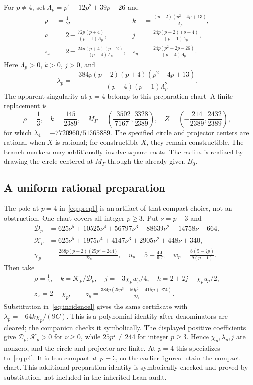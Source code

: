 \documentclass[11pt,a4paper]{article}
\theoremstyle{remark}\newtheorem{remark}[theorem]{Remark}
\begin{document}
For $p\ne4$, set $\Lambda_p=p^3+12p^2+39p-26$ and
\begin{align}
 \rho&=\tfrac12,& k&=\frac{(p-2)(p^2-4p+13)}{\Lambda_p},\label{eq:prep1}\\
 h&=2-\frac{72p(p+4)}{(p-1)\Lambda_p},&j&=\frac{24p(p-2)(p+4)}{(p-1)\Lambda_p},\nonumber\\
 z_x&=2-\frac{24p(p+4)(p-2)}{(p-4)\Lambda_p},&z_y&=\frac{24p(p^2+2p-26)}{(p-4)\Lambda_p}.\nonumber
\end{align}
Here $\Lambda_p>0$, $k>0$, $j>0$, and
\[
 \lambda_p=-\frac{384p(p-2)(p+4)(p^2-4p+13)}{(p-4)(p-1)\Lambda_p^2}.
\]
The apparent singularity at $p=4$ belongs to this preparation chart. A finite replacement is
\begin{equation}\label{eq:p4}
 \rho=\frac13,\quad k=\frac{145}{2389},\quad
 M_\Gamma=\left(\frac{13502}{7167},\frac{3328}{2389}\right),\quad
 Z=\left(-\frac{214}{2389},\frac{2432}{2389}\right),
\end{equation}
for which $\lambda_4=-7720960/51365889$. The specified circle and projector centers are rational when $X$ is rational; for constructible $X$, they remain constructible. The branch markers may additionally involve square roots. The radius is realized by drawing the circle centered at $M_\Gamma$ through the already given $B_0$.

\subsection{A uniform rational preparation}
The pole at $p=4$ in~\eqref{eq:prep1} is an artifact of that compact choice, not an obstruction. One chart covers all integer $p\ge3$. Put $\nu=p-3$ and
\begin{align*}
 \mathcal D_p&=625\nu^5+10525\nu^4+56797\nu^3+88639\nu^2+14758\nu+664,\\
 \mathcal K_p&=625\nu^5+1975\nu^4+4147\nu^3+2905\nu^2+448\nu+340,\\
 \chi_p&=\frac{288p(p-2)(25p^2-244)}{\mathcal D_p},\quad
 u_p=5-\frac{4A}{9C},\quad w_p=\frac{8(5-2p)}{9(p-1)}.
\end{align*}
Then take
\begin{equation}\label{eq:uniform}
\begin{gathered}
 \rho=\tfrac13,\quad k=\mathcal K_p/\mathcal D_p,\quad j=-3\chi_pw_p/4,\quad h=2+2j-\chi_pu_p/2,\\
 z_x=2-\chi_p,\qquad z_y=\frac{384p(25p^3-50p^2-415p+974)}{\mathcal D_p}.
\end{gathered}
\end{equation}
Substitution in~\eqref{eq:incidenceI} gives the same certificate with $\lambda_p=-64k\chi_p/(9C)$. This is a polynomial identity after denominators are cleared; the companion checks it symbolically. The displayed positive coefficients give $\mathcal D_p,\mathcal K_p>0$ for $\nu\ge0$, while $25p^2\ne244$ for integer $p\ge3$. Hence $\chi_p,\lambda_p,j$ are nonzero, and the circle and projector are finite. At $p=4$ this specializes to~\eqref{eq:p4}. It is less compact at $p=3$, so the earlier figures retain the compact chart. This additional preparation identity is symbolically checked and proved by substitution, not included in the inherited Lean audit.
\end{document}

